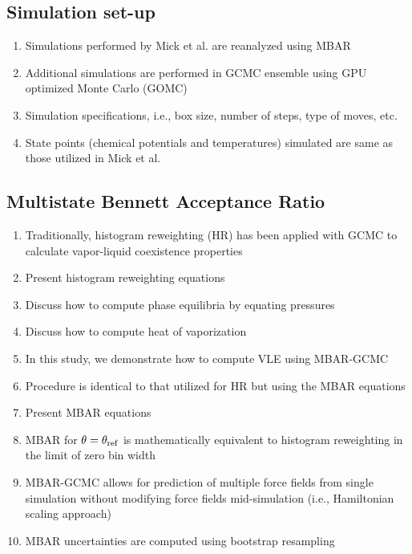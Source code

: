 \documentclass[journal=jced,manuscript=article]{achemso}
\begin{document}
\subsection{Simulation set-up} \label{sec: Simulation set-up}

\begin{enumerate}
	\item Simulations performed by Mick et al. are reanalyzed using MBAR
	\item Additional simulations are performed in GCMC ensemble using GPU optimized Monte Carlo (GOMC)
	\item Simulation specifications, i.e., box size, number of steps, type of moves, etc.
	\item State points (chemical potentials and temperatures) simulated are same as those utilized in Mick et al.
\end{enumerate}

\subsection{Multistate Bennett Acceptance Ratio} \label{sec: MBAR}

\begin{enumerate}
	\item Traditionally, histogram reweighting (HR) has been applied with GCMC to calculate vapor-liquid coexistence properties
	\item Present histogram reweighting equations
	\item Discuss how to compute phase equilibria by equating pressures
	\item Discuss how to compute heat of vaporization
	\item In this study, we demonstrate how to compute VLE using MBAR-GCMC
	\item Procedure is identical to that utilized for HR but using the MBAR equations
	\item Present MBAR equations
	\item MBAR for $\theta = \theta_{\rm ref}$ is mathematically equivalent to histogram reweighting in the limit of zero bin width
	\item MBAR-GCMC allows for prediction of multiple force fields from single simulation without modifying force fields mid-simulation (i.e., Hamiltonian scaling approach)
	\item MBAR uncertainties are computed using bootstrap resampling
\end{enumerate}
\end{document}
